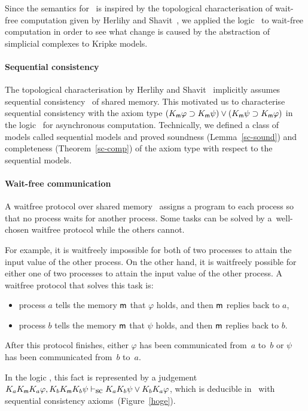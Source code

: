 Since the semantics for \iec\, is inspired by the topological characterisation of wait-free
computation given by Herlihy and Shavit~\cite{herlihy1999topological},
we applied the logic \iec\, to wait-free computation in order to see
what change is caused by the abstraction of simplicial complexes to Kripke models.

\paragraph{Sequential consistency}
The topological characterisation by Herlihy and Shavit~\cite{herlihy1999topological}
implicitly assumes sequential consistency~\cite{lamport1979make} of shared memory.  
This motivated us to characterise sequential consistency with the axiom type
$(K_{\sf m} \varphi\supset K_{\sf m} \psi)\vee (K_{\sf m}
       \psi\supset K_{\sf m} \varphi)$
in the logic \iec\, for asynchronous computation.
Technically, we defined a class of models called sequential models
and proved soundness
(Lemma~\ref{sc-sound}) and completeness
 (Theorem~\ref{sc-comp}) of the axiom type with respect to the sequential models.

\paragraph{Wait-free communication}
A waitfree protocol over shared memory~\cite{herlihy1991wait}
 assigns a program to each process so that no process waits for another process.
Some tasks can be solved by a~well-chosen waitfree protocol while the others cannot.

For example, 
 it is waitfreely impossible for both of two processes to attain the input value of the other
 process.
 On the other hand, it is waitfreely possible for
 either one of two processes to attain the input value of the other process.
 A waitfree protocol that solves this task is:
\begin{itemize}
 \item process $a$ tells the memory ${\sf m}$ that $\varphi$ holds, and then ${\sf m}$ replies back to $a$,
 \item process $b$ tells the memory ${\sf m}$ that $\psi$    holds, and then ${\sf m}$ replies back to $b$.
\end{itemize}
After this protocol finishes,
  either $\varphi$ has been communicated from~$a$ to~$b$ 
or $\psi$ has
been communicated from~$b$ to~$a$.

In the
 logic \iec, this fact is represented by a judgement $K_aK_{\sf m}{}K_a\varphi,
K_bK_{\sf m}{}K_b\psi\vdash_{\mbox{\rm sc}} K_aK_b\psi\vee K_bK_a\varphi$,
which is deducible in \iec\, with
sequential consistency axioms~(Figure~\ref{hoge}).

